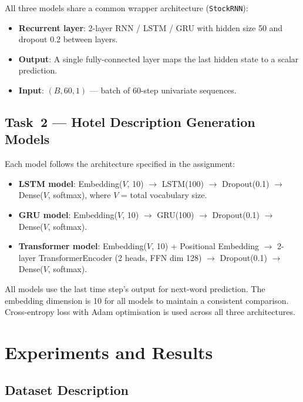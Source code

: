 \documentclass[11pt,letterpaper]{article}
\begin{document}
All three models share a common wrapper architecture (\texttt{StockRNN}):
\begin{itemize}[noitemsep]
  \item \textbf{Recurrent layer}: 2-layer RNN / LSTM / GRU with hidden size 50 and
        dropout 0.2 between layers.
  \item \textbf{Output}: A single fully-connected layer maps the last hidden state to
        a scalar prediction.
  \item \textbf{Input}: $(B, 60, 1)$ --- batch of 60-step univariate sequences.
\end{itemize}

\subsection{Task~2 --- Hotel Description Generation Models}

Each model follows the architecture specified in the assignment:

\begin{itemize}[noitemsep]
  \item \textbf{LSTM model}: Embedding($V$, 10) $\to$ LSTM(100) $\to$ Dropout(0.1)
        $\to$ Dense($V$, softmax), where $V$ = total vocabulary size.
  \item \textbf{GRU model}: Embedding($V$, 10) $\to$ GRU(100) $\to$ Dropout(0.1)
        $\to$ Dense($V$, softmax).
  \item \textbf{Transformer model}: Embedding($V$, 10) + Positional Embedding $\to$
        2-layer TransformerEncoder (2 heads, FFN dim 128) $\to$ Dropout(0.1) $\to$
        Dense($V$, softmax).
\end{itemize}

All models use the last time step's output for next-word prediction.
The embedding dimension is 10 for all models to maintain a consistent comparison.
Cross-entropy loss with Adam optimisation is used across all three architectures.

\section{Experiments and Results}

\subsection{Dataset Description}
\end{document}
